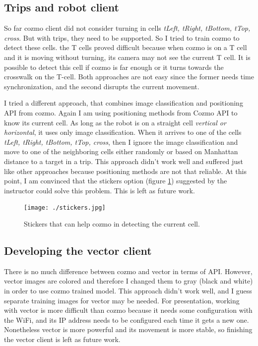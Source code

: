 \documentclass[12pt,a4paper]{article}
\begin{document}
\subsection{Trips and robot client}

So far cozmo client did not consider turning in cells \textit{tLeft, tRight, tBottom, tTop, cross}. But with trips, they need to be supported. So I tried to train cozmo to detect these cells. the T cells proved difficult because when cozmo is on a T cell and it is moving without turning, its camera may not see the current T cell. It is possible to detect this cell if cozmo is far enough or it turns towards the crosswalk on the T-cell. Both approaches are not easy since the former needs time synchronization, and the second disrupts the current movement. 

I tried a different approach, that combines image classification and positioning API from cozmo. Again I am using positioning methods from Cozmo API to know its current cell. As long as the robot is on a straight cell \textit{vertical or horizontal}, it uses only image classification. When it arrives to one of the cells \textit{tLeft, tRight, tBottom, tTop, cross}, then I ignore the image classification and move to one of the neighboring cells either randomly or  based on Manhattan distance to a target in a trip.  This approach didn't work well and suffered just like other approaches because positioning methods are not that reliable. At this point, I am convinced that the stickers option (figure \ref{fig:stickers}) suggested by the instructor could solve this problem. This is left as future work. 

\begin{figure}[H]
\center
\texttt{[image: ./stickers.jpg]}
\caption{Stickers that can help cozmo in detecting the current cell.}
\label{fig:stickers}
\end{figure}


\subsection{Developing the vector client} 

There is no much difference between cozmo and vector in terms of API. However, vector images are colored and therefore I changed them to gray (black and white) in order to use cozmo trained model. This approach didn't work well, and I guess separate training images for vector may be needed. 
For presentation, working with vector is more difficult than cozmo because it needs some configuration with the WiFi, and its IP address needs to be configured each time it gets a new one. Nonetheless vector is more powerful and its movement is more stable, so finishing the vector client is left as future work. 
\end{document}
